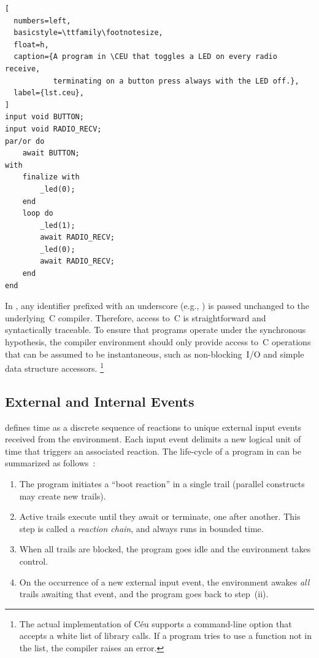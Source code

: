 \begin{lstlisting}[
  numbers=left,
  basicstyle=\ttfamily\footnotesize,
  float=h,
  caption={A program in \CEU that toggles a LED on every radio receive,
           terminating on a button press always with the LED off.},
  label={lst.ceu},
]
input void BUTTON;
input void RADIO_RECV;
par/or do
    await BUTTON;
with
    finalize with
        _led(0);
    end
    loop do
        _led(1);
        await RADIO_RECV;
        _led(0);
        await RADIO_RECV;
    end
end
\end{lstlisting}

In \CEU, any identifier prefixed with an underscore (e.g., ) is
passed unchanged to the underlying~C compiler.
%
Therefore, access to~C is straightforward and syntactically traceable.
%
To ensure that programs operate under the synchronous hypothesis, the compiler
environment should only provide access to~C operations that can be assumed to
be instantaneous, such as non-blocking~I/O and simple data structure accessors.%
\footnote {
The actual implementation of Céu supports a command-line option that accepts a
white list of library calls.
If a program tries to use a function not in the list, the compiler raises an
error.
}

\subsection{External and Internal Events}
\label{sec.ceu.evts}

\CEU defines time as a discrete sequence of reactions to unique external
input events received from the environment.
%
Each input event delimits a new logical unit of time that triggers an
associated reaction.
%
The life-cycle of a program in \CEU can be summarized as
follows~\cite{ceu.sensys13}:
%
\begin{enumerate}[i]
\item The program initiates a ``boot reaction'' in a single trail (parallel
      constructs may create new trails).
\item Active trails execute until they await or terminate, one after
      another.  This step is called a \emph{reaction chain}, and always runs in
      bounded time.
\item When all trails are blocked, the program goes idle and the environment
      takes control.
\item On the occurrence of a new external input event, the environment
      awakes \emph{all} trails awaiting that event, and the program goes back to
      step~(ii).
\end{enumerate}


